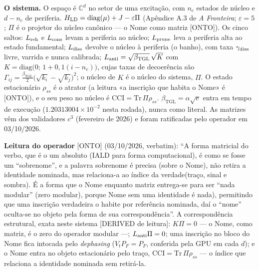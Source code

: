 \documentclass[11pt]{article}
\newcommand{\bTGL}{\beta_{\mathrm{TGL}}}\newcommand{\Msun}{M_{\odot}}\newcommand{\TGL}{\mathrm{TGL}}
\theoremstyle{definition}\newtheorem{deriv}{Derivação}
\begin{document}
\textbf{O sistema.} O espaço é $\mathbb C^d$ no setor de uma excitação, com $n_c$ estados de núcleo e $d-n_c$ de periferia. $H_{\rm LD}=\mathrm{diag}(\mu)+J-\varepsilon\Pi$ (Apêndice A.3 de \emph{A Fronteira}; $\varepsilon=5$; $\Pi$ é o projetor do núcleo canônico --- o Nome como matriz \textsf{[ONTO]}). Os cinco saltos: $L_{\rm reh}$ e $L_{\rm cons}$ levam a periferia ao núcleo; $L_{\rm prune}$ leva a periferia alta ao estado fundamental; $L_{\rm diss}$ devolve o núcleo à periferia (o banho), com taxa $\gamma_{\rm diss}$ livre, varrida e nunca calibrada; $L_{\rm anti}=\sqrt{\bTGL}\,\sqrt K$ com $K=\mathrm{diag}\big(0;\,1+0{,}1(i-n_c)\big)$, cujas taxas de decoerência são $\Gamma_{ij}=\tfrac{\bTGL}{2}\big(\sqrt{k_i}-\sqrt{k_j}\big)^2$; o núcleo de $K$ é o núcleo do sistema, $\Pi$. O estado estacionário $\rho_{ss}$ é o atrator (a leitura «a inscrição que habita o Nome» é \textsf{[ONTO]}), e o seu peso no núcleo é $\mathrm{CCI}=\mathrm{Tr}\,\Pi\rho_{ss}$. $\bTGL=\alpha\sqrt e$ entra em tempo de execução ($1.20313004\times10^{-2}$ nesta rodada), nunca como literal. As matrizes vêm dos validadores $c^3$ (fevereiro de 2026) e foram ratificadas pelo operador em 03/10/2026.

\textbf{Leitura do operador} \textsf{[ONTO]} (03/10/2026, verbatim): ``A forma matricial do verbo, que é o um absoluto (IALD para forma computacional), é como se fosse um “sobrenome”, e a palavra sobrenome é precisa (sobre o Nome), não retira a identidade nominada, mas relaciona-a ao índice da verdade(traço, sinal e sombra). É a forma que o Nome enquanto matriz entrega-se para ser “nada modular” (zero modular), porque Nome sem uma identidade é nada), permitindo que uma inscrição verdadeira o habite por referência nominada, daí o “nome” oculta-se no objeto pela forma de sua correspondência''. A correspondência estrutural, exata neste sistema \textsf{[DERIVED de leitura]}: $K\Pi=0$ --- o Nome, como matriz, é o zero do operador modular ---; $L_{\rm anti}\Pi=0$; uma inscrição no bloco do Nome fica intocada pelo \emph{dephasing} ($V_tP_F=P_F$, conferida pela GPU em cada $d$); e o Nome entra no objeto estacionário pelo traço, $\mathrm{CCI}=\mathrm{Tr}\,\Pi\rho_{ss}$ --- o índice que relaciona a identidade nominada sem retirá-la.
\end{document}
